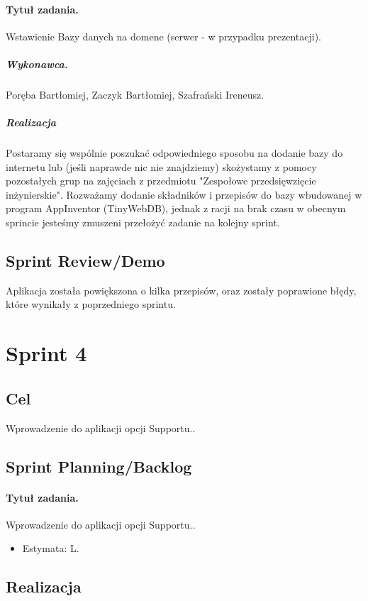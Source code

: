 \documentclass[a4paper]{article}
\begin{document}
	
	\paragraph{Tytuł zadania.} Wstawienie Bazy danych na domene (serwer - w przypadku prezentacji).
	\subparagraph{Wykonawca.} Poręba Bartłomiej, Zaczyk Bartłomiej, Szafrański Ireneusz.
	\subparagraph{Realizacja}
	Postaramy się wspólnie poszukać odpowiedniego sposobu na dodanie bazy do internetu lub (jeśli naprawde nic nie znajdziemy) skożystamy z pomocy pozostałych grup na zajęciach z przedmiotu "Zespołowe przedsięwzięcie inżynierskie". Rozważamy dodanie składników i przepisów do bazy wbudowanej w program AppInventor (TinyWebDB), jednak z racji na brak czasu w obecnym sprincie jesteśmy zmuszeni przełożyć zadanie na kolejny sprint.
	
	
	\subsection{Sprint Review/Demo}
	Aplikacja została powiększona o kilka przepisów, oraz zostały poprawione błędy, które wynikały z poprzedniego sprintu.
	
	
	\section{Sprint 4}
	
	\subsection{Cel} Wprowadzenie do aplikacji opcji Supportu..
	
	\subsection{Sprint Planning/Backlog}
	
	\paragraph{Tytuł zadania.} Wprowadzenie do aplikacji opcji Supportu..
	\begin{itemize}
		\item Estymata: L.
	\end{itemize}
	
	
	\subsection{Realizacja}
	
\end{document}

